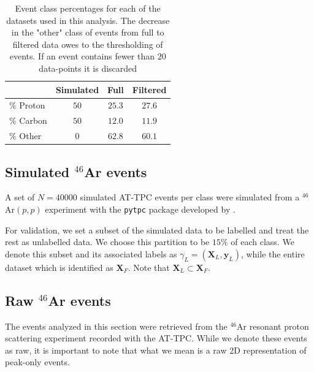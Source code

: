 \documentclass[review,number,sort&compress]{elsarticle}
\begin{document}
\begin{table}
\centering
\caption{Event class percentages for each of the datasets used in this analysis. The decrease in the "other" class of events from full to filtered data owes to the thresholding of events. If an event contains fewer than $20$ data-points it is discarded }\label{tab:class_distr}
\begin{tabular}{lccc}
\toprule
{} & Simulated & Full & Filtered \\
\midrule
$\%$ Proton & $50$ & $25.3$ & $27.6$ \\ 
$\%$ Carbon & $50$ & $12.0$ & $11.9$ \\
$\%$ Other & $0$ & $62.8$ & $60.1$ \\
\end{tabular}
\end{table}

\subsection{Simulated \texorpdfstring{${}^{46}$Ar}{46Ar}  events}\label{sec:data_sim}

A set of $N=40000$ simulated AT-TPC events per class were simulated from a ${}^{46}$Ar$(p, p)$ experiment with the \lstinline{pytpc} package developed by \citet{Bradt2017a}. %

For validation, we set a subset of the simulated data to be labelled and treat the rest as unlabelled data. We choose this partition to be $15\%$ of each class. We denote this subset and its associated labels as $\gamma_L=(\boldsymbol{X}_L, \boldsymbol{y}_L)$, while the entire dataset which is identified as $\boldsymbol{X}_F$. Note that $\boldsymbol{X}_L \subset \boldsymbol{X}_F$.



\subsection{Raw \texorpdfstring{${}^{46}$Ar}{46Ar}  events}\label{sec:data_real}

The events analyzed in this section were retrieved from the ${}^{46}$Ar resonant proton scattering experiment recorded with the AT-TPC. 
While we denote these events as raw, it is important to note that what we mean is a raw 2D representation of peak-only events.
\end{document}
